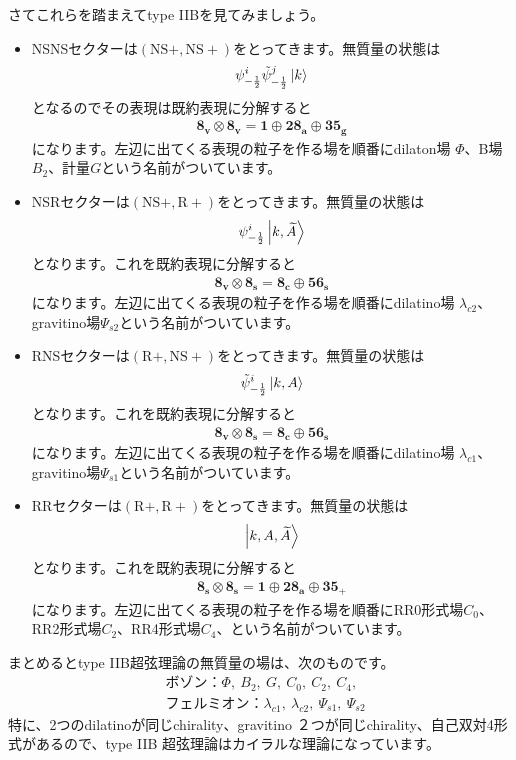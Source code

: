 \documentclass[report,paper=a4, fontsize=12pt, line_length=16cm, number_of_lines=34,dvipdfmx]{jlreq}
\numberwithin{equation}{chapter}
\numberwithin{equation}{section}
\newcommand{\At}{\widetilde{A}}
\newcommand{\psit}{\tilde{\psi}}
\newcommand{\NSp}{\mathrm{NS}+}
\newcommand{\Rp}{\mathrm{R}+}
\newcommand{\triv}{\mathbf{1}}
\newcommand{\etv}{\mathbf{8_v}}
\newcommand{\ets}{\mathbf{8_s}}
\newcommand{\etc}{\mathbf{8_c}}
\newcommand{\tweta}{\mathbf{28_{a}}}
\newcommand{\thfvg}{\mathbf{35_{g}}}
\newcommand{\thfvp}{\mathbf{35}_{+}}
\newcommand{\fsxs}{\mathbf{56_s}}
\begin{document}
さてこれらを踏まえてtype IIBを見てみましょう。
\begin{itemize}
  \item NSNSセクターは$(\NSp,\NSp)$をとってきます。無質量の状態は
  \begin{align}
    \psi_{-\frac12}^{i}\psit_{-\frac12}^{j}\ket{k}
  \end{align}
  となるのでその表現は既約表現に分解すると
  \begin{align}
    \etv\otimes\etv= \triv \oplus \tweta\oplus \thfvg
  \end{align}
  になります。左辺に出てくる表現の粒子を作る場を順番にdilaton場 $\Phi$、B場$B_2$、計量$G$という名前がついています。
  \item NSRセクターは$(\NSp,\Rp)$をとってきます。無質量の状態は
  \begin{align}
    \psi_{-\frac12}^{i}\ket{k,\At}
  \end{align}
  となります。これを既約表現に分解すると
  \begin{align}
    \etv\otimes\ets= \etc \oplus \fsxs
  \end{align}
  になります。左辺に出てくる表現の粒子を作る場を順番にdilatino場 $\lambda_{c2}$、gravitino場$\Psi_{s2}$という名前がついています。
  \item RNSセクターは$(\Rp,\NSp)$をとってきます。無質量の状態は
  \begin{align}
    \psit_{-\frac12}^{i}\ket{k,A}
  \end{align}
  となります。これを既約表現に分解すると
  \begin{align}
    \etv\otimes\ets= \etc \oplus \fsxs
  \end{align}
  になります。左辺に出てくる表現の粒子を作る場を順番にdilatino場 $\lambda_{c1}$、gravitino場$\Psi_{s1}$という名前がついています。
  \item RRセクターは$(\Rp,\Rp)$をとってきます。無質量の状態は
  \begin{align}
    \ket{k,A,\At}
  \end{align}
  となります。これを既約表現に分解すると
  \begin{align}
    \ets\otimes\ets= \triv\oplus \tweta \oplus \thfvp
  \end{align}
  になります。左辺に出てくる表現の粒子を作る場を順番にRR0形式場$C_0$、RR2形式場$C_2$、RR4形式場$C_4$、という名前がついています。
\end{itemize}
まとめるとtype IIB超弦理論の無質量の場は、次のものです。
\begin{align}
  &\text{ボゾン：}\Phi,\ B_2,\ G,\ C_0,\ C_2,\ C_4,\\
  &\text{フェルミオン：} \lambda_{c1},\ \lambda_{c2},\ \Psi_{s1},\ \Psi_{s2}
\end{align}
特に、2つのdilatinoが同じchirality、gravitino ２つが同じchirality、自己双対4形式があるので、type IIB 超弦理論はカイラルな理論になっています。
\end{document}
